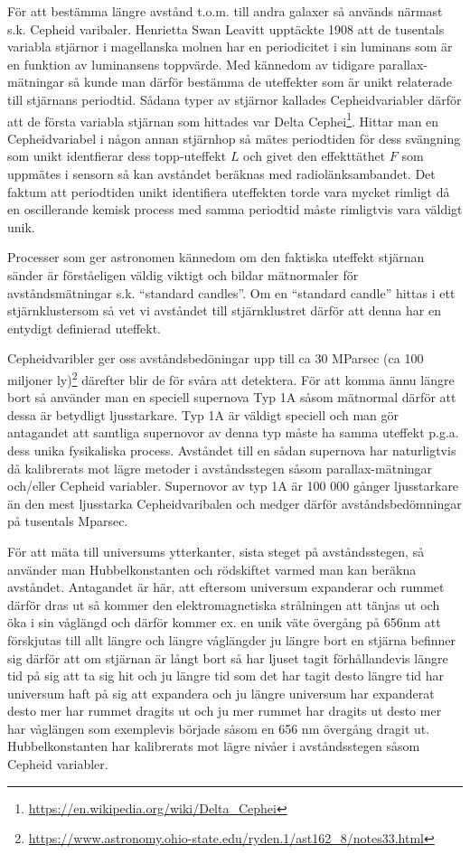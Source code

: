 \documentclass[./exercises.tex]{subfiles}
\begin{document}
För att bestämma längre avstånd t.o.m. till andra galaxer så används närmast s.k. Cepheid varibaler. Henrietta Swan Leavitt upptäckte 1908 att de tusentals variabla stjärnor i magellanska molnen
har en periodicitet i sin luminans som är en funktion av luminansens toppvärde. Med kännedom
av tidigare parallax-mätningar så kunde man därför bestämma de uteffekter som är unikt relaterade
till stjärnans periodtid. Sådana typer av stjärnor kallades Cepheidvariabler därför att de första variabla stjärnan som hittades
var Delta Cephei\footnote{\url{https://en.wikipedia.org/wiki/Delta_Cephei}}.
Hittar man en Cepheidvariabel i  någon annan stjärnhop så mätes periodtiden
för dess svängning som unikt identfierar dess topp-uteffekt $L$ och givet den effekttäthet $F$ som uppmätes
i sensorn så kan avståndet beräknas med radiolänksambandet.
Det faktum att periodtiden unikt identifiera uteffekten torde vara mycket rimligt då en oscillerande
kemisk process med samma periodtid måste rimligtvis vara väldigt unik.

Processer som ger astronomen kännedom om den faktiska uteffekt stjärnan sänder är förståeligen väldig viktigt
och bildar mätnormaler för avståndsmätningar s.k. ``standard candles''. 
Om en ``standard candle'' hittas i ett stjärnklustersom så vet vi avståndet till stjärnklustret därför att 
denna har en entydigt definierad uteffekt.

Cepheidvaribler ger oss avståndsbedöningar upp till ca 30 MParsec (ca 100 miljoner ly)\footnote{\url{https://www.astronomy.ohio-state.edu/ryden.1/ast162_8/notes33.html}} därefter blir de för svåra att detektera.
För att komma ännu längre bort så använder man en speciell supernova Typ 1A såsom mätnormal därför att dessa är betydligt
ljusstarkare.
Typ 1A är väldigt speciell och man gör antagandet att samtliga supernovor av denna typ måste ha samma
uteffekt p.g.a. dess unika fysikaliska process.
Avståndet till en sådan supernova har naturligtvis då kalibrerats mot lägre metoder i avståndsstegen
såsom parallax-mätningar och/eller Cepheid variabler. Supernovor av typ 1A är 100 000 gånger ljusstarkare
än den mest ljusstarka Cepheidvaribalen och medger därför avståndsbedömningar på tusentals Mparsec.

För att mäta till universums ytterkanter, sista steget på avståndsstegen, så använder man Hubbelkonstanten och rödskiftet varmed man kan beräkna
avståndet. Antagandet är här, att eftersom universum expanderar och rummet därför dras ut så kommer
den elektromagnetiska strålningen att tänjas ut och öka i sin våglängd och därför kommer ex. en unik väte
övergång på 656nm att förskjutas till allt längre och längre våglängder ju längre bort en stjärna befinner sig därför
att om stjärnan är långt bort så har ljuset tagit förhållandevis längre tid på sig att ta sig hit och ju längre
tid som det har tagit desto längre tid har universum haft på sig att expandera och ju längre universum
har expanderat desto mer har rummet dragits ut och ju mer rummet har dragits ut desto mer har våglängen
som exemplevis började såsom en 656 nm övergång dragit ut.
Hubbelkonstanten har kalibrerats mot lägre nivåer i avståndsstegen såsom Cepheid variabler.
\end{document}
